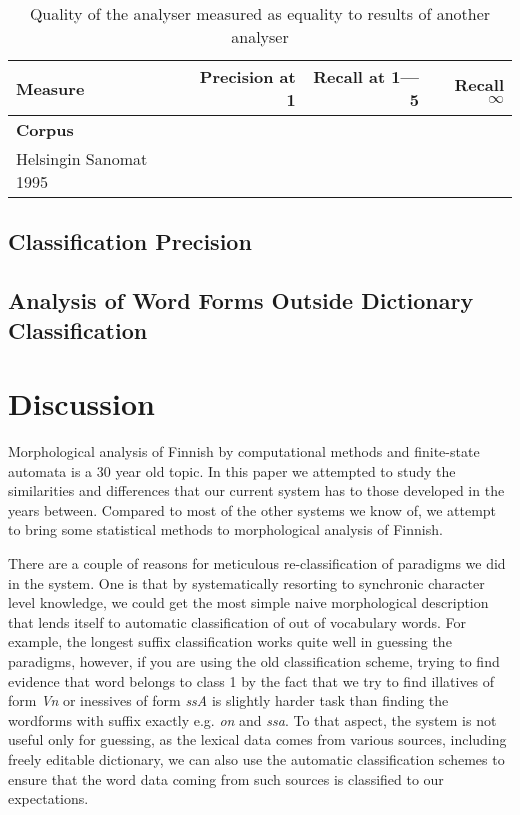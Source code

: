 \documentclass[a4paper,12pt]{article}
\begin{document}
\begin{table}
    \centering
    \begin{tabular}{|l|r|r|r|}
        \hline
        \bf Measure & Precision at 1 & Recall at 1---5 & Recall $\infty$  \\
        \hline
        \bf Corpus & & & \\
        \hline
        Helsingin Sanomat 1995 & & & \\
        \hline
    \end{tabular}
    \caption{Quality of the analyser measured as equality to results of
        another analyser \label{table:quality}}
\end{table}

\subsection{Classification Precision}


\subsection{Analysis of Word Forms Outside Dictionary Classification}


\section{Discussion}

Morphological analysis of Finnish by computational methods and finite-state
automata is a 30 year old topic. In this paper we attempted to study the
similarities and differences that our current system has to those developed
in the years between. Compared to most of the other systems we know of,
we attempt to bring some statistical methods to morphological analysis of
Finnish. 

There are a couple of reasons for meticulous re-classification of paradigms
we did in the system. One is that by systematically resorting to synchronic
character level knowledge, we could get the most simple naive morphological
description that lends itself to automatic classification of out of vocabulary
words. For example, the longest suffix classification works quite well in
guessing the paradigms, however, if you are using the old classification
scheme, trying to find evidence that word belongs to class 1 by the fact that
we try to find illatives of form \emph{Vn} or inessives of form \emph{ssA} is
slightly harder task than finding the wordforms with suffix exactly e.g.
\emph{on} and \emph{ssa}. To that aspect, the system is not useful only
for guessing, as the lexical data comes from various sources, including
freely editable dictionary, we can also use the automatic classification
schemes to ensure that the word data coming from such sources is classified to
our expectations.
\end{document}
